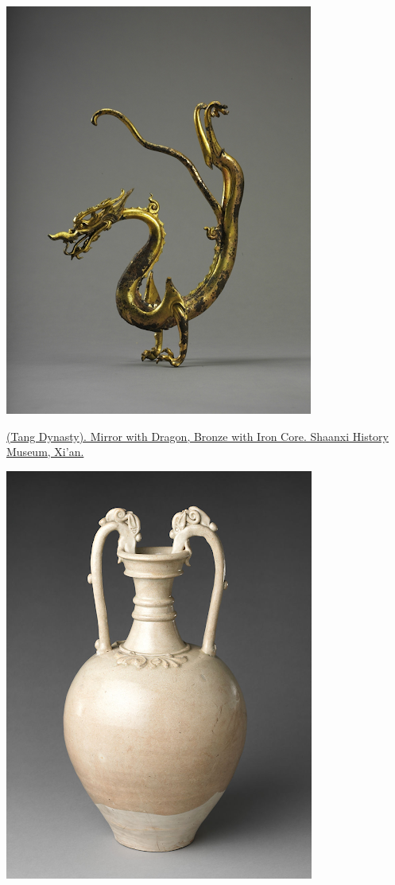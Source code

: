 \documentclass[
]{book}
\begin{document}
\includegraphics[width=\textwidth,height=0.7\textheight]{images/gilded_dragon.png}

\href{}{(Tang Dynasty). Mirror with Dragon, Bronze with Iron Core. Shaanxi History Museum, Xi'an.}

\includegraphics{images/jar.png}
\end{document}

